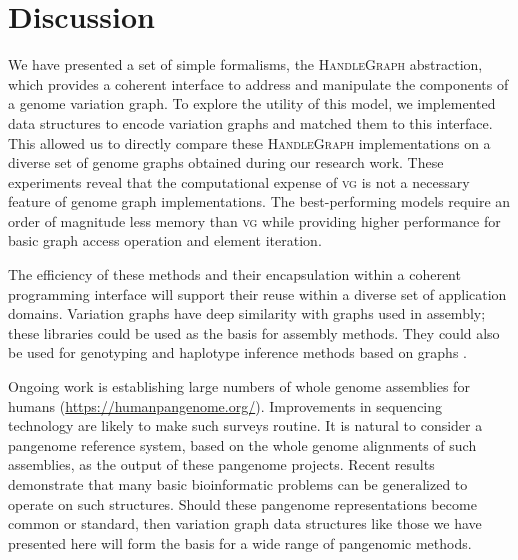\documentclass{article}
\begin{document}
\section{Discussion}

We have presented a set of simple formalisms, the \textsc{HandleGraph} abstraction, which provides a coherent interface to address and manipulate the components of a genome variation graph.
To explore the utility of this model, we implemented data structures to encode variation graphs and matched them to this interface.
This allowed us to directly compare these \textsc{HandleGraph} implementations on a diverse set of genome graphs obtained during our research work.
These experiments reveal that the computational expense of \textsc{vg} is not a necessary feature of genome graph implementations.
The best-performing models require an order of magnitude less memory than \textsc{vg} while providing higher performance for basic graph access operation and element iteration.

The efficiency of these methods and their encapsulation within a coherent programming interface will support their reuse within a diverse set of application domains.
Variation graphs have deep similarity with graphs used in assembly; these libraries could be used as the basis for assembly methods.
They could also be used for genotyping and haplotype inference methods based on graphs \cite{garg2018graph}.

Ongoing work is establishing large numbers of whole genome assemblies for humans (\url{https://humanpangenome.org/}).
Improvements in sequencing technology are likely to make such surveys routine.
It is natural to consider a pangenome reference system, based on the whole genome alignments of such assemblies, as the output of these pangenome projects.
Recent results demonstrate that many basic bioinformatic problems can be generalized to operate on such structures.
Should these pangenome representations become common or standard, then variation graph data structures like those we have presented here will form the basis for a wide range of pangenomic methods.




\end{document}
